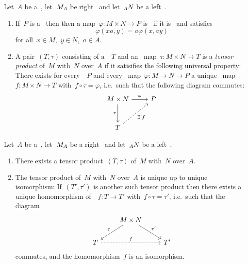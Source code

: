\begin{definition}
  Let~$A$ be a~{\kalg}, let~$\indmodule{M}[A]$ be right~{} and let~$\indmodule[A]{N}$ be a left~{}.
  \begin{enumerate}
    \item
      If~$P$ is a~{\module{$\kf$}} then then a map~$\varphi \colon M \times N \to P$ is~\emph{} if it is~{\kbilin} and satisfies
      \[
          \varphi(xa, y)
        = a\varphi(x, ay)
      \]
      for all~$x \in M$,~$y \in N$,~$a \in A$.
    \item
      A pair~$(T,\tau)$ consisting of a~{\module{$\kf$}}~$T$ and an~{} map~$\tau \colon M \times N \to T$ is a \emph{tensor product} of~$M$ with~$N$ over~$A$ if it satisifies the following universal property:
      There exists for every~{\module{$\kf$}}~$P$ and every~{} map~$\varphi \colon M \to N \to P$ a unique~{\klin} map~$f \colon M \times N \to T$ with~$f \circ \tau = \varphi$, i.e.\ such that the following diagram commutes:
      \[
        \begin{tikzcd}[row sep = large]
            M \times N
            \arrow{r}[above]{\varphi}
            \arrow{d}[left]{\tau}
          & P
          \\
            T
            \arrow[dashed]{ur}[below right]{\exists! f}
          & {}
        \end{tikzcd}
      \]
  \end{enumerate}
\end{definition}


\begin{lemma}

Let~$A$ be a~{\kalg}, let~$\indmodule{M}[A]$ be a right~{} and let~$\indmodule[A]{N}$ be a left~{}.
  \begin{enumerate}
    \item
      There exists a tensor product~$(T,\tau)$ of~$M$ with~$N$ over~$A$.
    \item
      The tensor product of~$M$ with~$N$ over~$A$ is unique up to unique isomorphism:
      If~$(T',\tau')$ is another such tensor product then there exists a unique homomorphism of~{\modules{$\kf$}}~$f \colon T \to T'$ with~$f \circ \tau = \tau'$, i.e.\ such that the diagram
      \[
        \begin{tikzcd}
            {}
          & M \times N
            \arrow{dl}[above left]{\tau}
            \arrow{dr}[above right]{\tau'}
          & {}
          \\
            T
            \arrow[dashed]{rr}[above]{f}
          & {}
          & T'
        \end{tikzcd}
      \]
      commutes, and the homomorphism~$f$ is an isomorphism.
  \end{enumerate}
\end{lemma}


